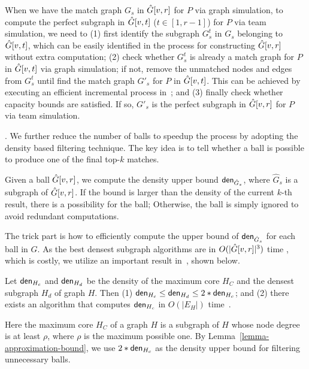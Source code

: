 When we have the match graph $G_s$ in $\hat{G}{[v, r]}$ for $P$ via graph simulation, to compute the perfect subgraph in $\hat{G}{[v, t]}$ ($t \in [1,r-1]$) for $P$ via team simulation, we need to
(1) first identify the subgraph $G_s^{t}$ in $G_s$ belonging to $\hat{G}{[v, t]}$, which can be easily identified in the process for constructing $\hat{G}{[v, r]}$ without extra computation;
(2) check whether $G_s^{t}$ is already a match graph for $P$ in $\hat{G}{[v, t]}$ via graph simulation; if not, remove the unmatched nodes and edges from $G_s^{t}$ until find the match graph $G'_s$ for $P$ in $\hat{G}{[v, t]}$. This can be achieved by executing an efficient incremental process in~\cite{FanWW13-tods}; and
(3) finally check whether capacity bounds are satisfied. If so, $G'_s$ is the perfect subgraph in $\hat{G}{[v, r]}$ for $P$ via team simulation.

. We further reduce the number of balls to speedup the process by adopting the density based filtering technique.
The key idea is to tell whether a ball is possible to produce one of the final top-$k$ matches.

Given a ball $\hat{G}{[v,r]}$, we compute the density upper bound  ${\mathsf{den}}_{\hat{G}_s}$,
where $\hat{G}_s$ is a subgraph of $\hat{G}{[v,r]}$.
If the bound is larger than the density of the current $k$-th result, \ie there is a possibility for the ball;
Otherwise, the ball is simply ignored to avoid redundant computations.

The trick part is how to efficiently compute the upper bound of ${\mathsf{den}}_{\hat{G}_s}$ for each ball in $G$.
As the best densest subgraph algorithms are in $O(|\hat{G}{[v,r]}|^3)$ time \cite{maximumDenseSubgraph}, which is costly,
we utilize an important result in~\cite{EVMK12}, shown below.



\begin{lemma}
	\label{lemma-approximation-bound}
	Let ${\mathsf{den}}_{H_{c}}$ and ${\mathsf{den}}_{H_{d}}$ be the density of the maximum core  $H_{C}$  and the  densest subgraph $H_{d}$ of graph $H$. Then (1) ${\mathsf{den}}_{H_{c}}\leq {\ensuremath {\mathsf{den}}}_{H_{d}} \leq 2*{\mathsf{den}}_{H_{c}}$; and (2) there exists an algorithm that computes ${\mathsf{den}}_{H_{c}}$ in $O(|E_H|)$ time~\cite{EVMK12}.
\end{lemma}


Here the maximum core $H_{C}$ of a graph $H$ is a subgraph of $H$ whose node degree is at least $\rho$, where $\rho$ is the maximum possible one. By Lemma~\ref{lemma-approximation-bound}, we use $2*{\mathsf{den}}_{H_{c}}$ as the density upper bound for filtering unnecessary balls.


